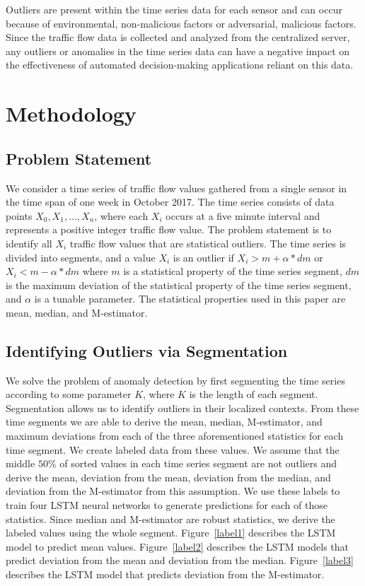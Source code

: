 \documentclass[conference]{IEEEtran}
\begin{document}
Outliers are present within the time series data for each sensor and can occur because of environmental, non-malicious factors or adversarial, malicious factors. Since the traffic flow data is collected and analyzed from the centralized server, any outliers or anomalies in the time series data can have a negative impact on the effectiveness of automated decision-making applications reliant on this data. 

\section{Methodology}
\label{methodology}
\subsection{Problem Statement}
We consider a time series of traffic flow values gathered from a single sensor in the time span of one week in October 2017. The time series consists of data points $X_0, X_1, ... , X_n$, where each $X_i$ occurs at a five minute interval and represents a positive integer traffic flow value. The problem statement is to identify all $X_i$ traffic flow values that are statistical outliers. The time series is divided into segments, and a value $X_i$ is an outlier if $X_i > m + \alpha * dm$ or $X_i < m - \alpha * dm$ where $m$ is a statistical property of the time series segment, $dm$ is the maximum deviation of the statistical property of the time series segment, and $\alpha$ is a tunable parameter. The statistical properties used in this paper are mean, median, and M-estimator. 

\subsection{Identifying Outliers via Segmentation}

We solve the problem of anomaly detection by first segmenting the time series according to some parameter $K$, where $K$ is the length of each segment. Segmentation allows us to identify outliers in their localized contexts. From these time segments we are able to derive the mean, median, M-estimator, and maximum deviations from each of the three aforementioned statistics for each time segment. We create labeled data from these values. We assume that the middle $50\%$ of sorted values in each time series segment are not outliers and derive the mean, deviation from the mean, deviation from the median, and deviation from the M-estimator from this assumption. We use these labels to train four LSTM neural networks to generate predictions for each of those statistics. Since median and M-estimator are robust statistics, we derive the labeled values using the whole segment. Figure~\ref{label1} describes the LSTM model to predict mean values. Figure~\ref{label2} describes the LSTM models that predict deviation from the mean and deviation from the median. Figure~\ref{label3} describes the LSTM model that predicts deviation from the M-estimator.
\end{document}
